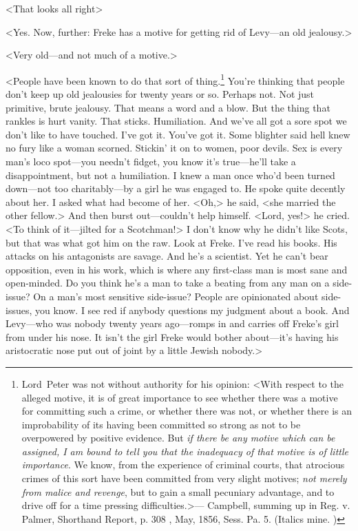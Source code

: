 <That looks all right\longdash>

<Yes. Now, further: Freke has a motive for getting rid of Levy—an old jealousy.>

<Very old—and not much of a motive.>

<People have been known to do that sort of thing.\footnote{Lord~Peter was not without authority for his opinion: <With respect to the alleged motive, it is of great importance to see whether there was a motive for committing such a crime, or whether there was not, or whether there is an improbability of its having been committed so strong as not to be overpowered by positive evidence. But \emph{if there be any motive which can be assigned, I am bound to tell you that the inadequacy of that motive is of little importance}. We know, from the experience of criminal courts, that atrocious crimes of this sort have been committed from very slight motives; \emph{not merely from malice and revenge}, but to gain a small pecuniary advantage, and to drive off for a time pressing difficulties.>— Campbell, summing up in Reg. v. Palmer, Shorthand Report, p. 308 , May, 1856, Sess. Pa. 5. (Italics mine. )}	You're thinking that people don't keep up old jealousies for twenty years or so. Perhaps not. Not just primitive, brute jealousy. That means a word and a blow. But the thing that rankles is hurt vanity. That sticks. Humiliation. And we've all got a sore spot we don't like to have touched. I've got it. You've got it. Some blighter said hell knew no fury like a woman scorned. Stickin' it on to women, poor devils. Sex is every man's loco spot—you needn't fidget, you know it's true—he'll take a disappointment, but not a humiliation. I knew a man once who'd been turned down—not too charitably—by a girl he was engaged to. He spoke quite decently about her. I asked what had become of her. <Oh,> he said, <she married the other fellow.> And then burst out—couldn't help himself. <Lord, yes!> he cried. <To think of it—jilted for a Scotchman!> I don't know why he didn't like Scots, but that was what got him on the raw. Look at Freke. I've read his books. His attacks on his antagonists are savage. And he's a scientist. Yet he can't bear opposition, even in his work, which is where any first-class man is most sane and open-minded. Do you think he's a man to take a beating from any man on a side-issue? On a man's most sensitive side-issue? People are opinionated about side-issues, you know. I see red if anybody questions my judgment about a book. And Levy—who was nobody twenty years ago—romps in and carries off Freke's girl from under his nose. It isn't the girl Freke would bother about—it's having his aristocratic nose put out of joint by a little Jewish nobody.>

